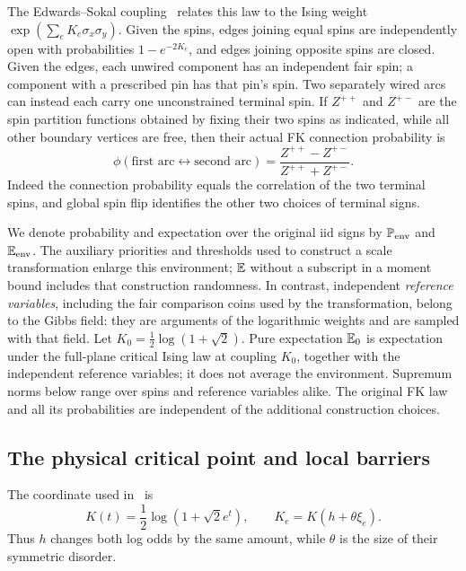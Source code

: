 The Edwards--Sokal coupling~\cite{ES} relates this law to the Ising
weight $\exp(\sum_e K_e\sigma_x\sigma_y)$.  Given the spins, edges
joining equal spins are independently open with probabilities
$1-e^{-2K_e}$, and edges joining opposite spins are closed.  Given the
edges, each unwired component has an independent fair spin; a component
with a prescribed pin has that pin's spin.  Two separately wired arcs
can instead each carry one unconstrained terminal spin.  If
$Z^{++}$ and $Z^{+-}$ are the spin partition functions obtained by fixing
their two spins as indicated, while all other boundary vertices are
free, then their actual FK connection probability is
\begin{equation}
 \phi(\text{first arc}\leftrightarrow\text{second arc})
 =\frac{Z^{++}-Z^{+-}}{Z^{++}+Z^{+-}}.
 \label{eq:es-partition-ratio}
\end{equation}
Indeed the connection probability equals the correlation of the two
terminal spins, and global spin flip identifies the other two choices
of terminal signs.

We denote probability and expectation over the original iid signs by
$\P_{\mathrm{env}}$ and $\E_{\mathrm{env}}$.  The auxiliary priorities
and thresholds used to construct a scale transformation enlarge this
environment; $\E$ without a subscript in a moment bound includes that
construction randomness.  In contrast, independent \emph{reference
variables}, including the fair comparison coins used by the
transformation, belong to the Gibbs field: they are arguments of the
logarithmic weights and are sampled with that field.  Let
$K_0=\frac12\log(1+\sqrt2)$.  Pure expectation $\E_0$ is expectation
under the full-plane critical Ising law at coupling $K_0$, together with
the independent reference variables; it does not average the environment.
Supremum norms below range over spins and reference variables alike.
The original FK law and all its probabilities are independent of the
additional construction choices.

\subsection{The physical critical point and local barriers}

The coordinate used in~\cite{Q} is
\begin{equation}
 K(t)=\frac12\log(1+\sqrt2 e^t),\qquad
 K_e=K(h+\theta\xi_e).
 \label{eq:critical-coordinate}
\end{equation}
Thus $h$ changes both log odds by the same amount, while $\theta$ is
the size of their symmetric disorder.

